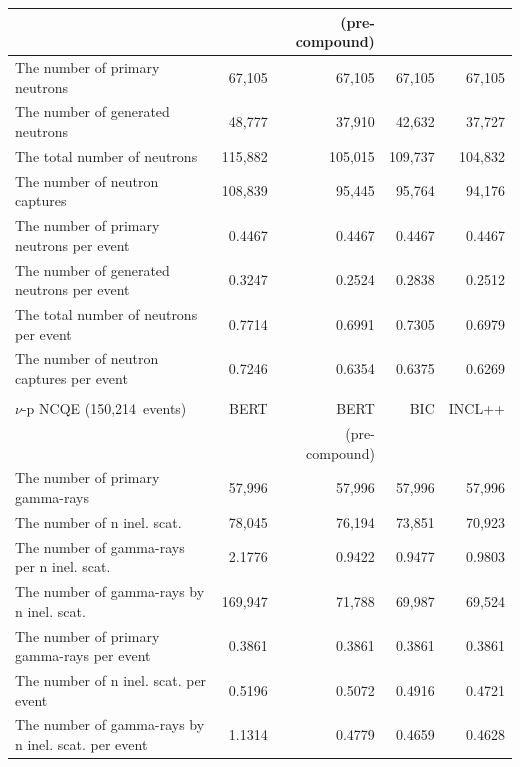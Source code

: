 \begin{table}[h]
\begin{tabular}{lrrrr}
		                                                    &         & (pre-compound) &         &         \\ \hline
		The number of primary neutrons                      &  67,105 &         67,105 &  67,105 &  67,105 \\
		The number of generated neutrons                    &  48,777 &         37,910 &  42,632 &  37,727 \\
		The total number of neutrons                        & 115,882 &        105,015 & 109,737 & 104,832 \\
		The number of neutron captures                      & 108,839 &         95,445 &  95,764 &  94,176 \\ \hline
		The number of primary neutrons per event            &  0.4467 &         0.4467 &  0.4467 &  0.4467 \\
		The number of generated neutrons per event          &  0.3247 &         0.2524 &  0.2838 &  0.2512 \\
		The total number of neutrons per event              &  0.7714 &         0.6991 &  0.7305 &  0.6979 \\
		The number of neutron captures per event            &  0.7246 &         0.6354 &  0.6375 &  0.6269 \\ \hline \hline
		&&& \\ \hline \hline
		$\nu$-p NCQE (150,214~events)                       &    BERT &           BERT &     BIC &  INCL++ \\
		                                                    &         & (pre-compound) &         &         \\ \hline
		The number of primary gamma-rays                    &  57,996 &         57,996 &  57,996 &  57,996 \\
		The number of n inel. scat.                         &  78,045 &         76,194 &  73,851 &  70,923 \\
		The number of gamma-rays per n inel. scat.          &  2.1776 &         0.9422 &  0.9477 &  0.9803 \\
		The number of gamma-rays by n inel. scat.           & 169,947 &         71,788 &  69,987 &  69,524 \\ \hline
		The number of primary gamma-rays per event          &  0.3861 &         0.3861 &  0.3861 &  0.3861 \\
		The number of n inel. scat. per event               &  0.5196 &         0.5072 &  0.4916 &  0.4721 \\
		The number of gamma-rays by n inel. scat. per event &  1.1314 &         0.4779 &  0.4659 &  0.4628 \\ \hline \hline
	\end{tabular}
\end{table}

